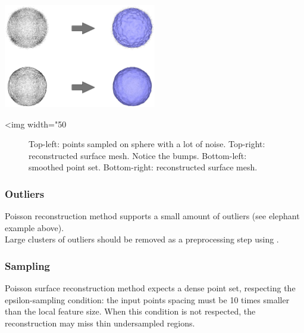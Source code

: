 \begin{center}
    \label{Surface_reconstruction_points_3-fig-noise}
    \begin{ccTexOnly}
      \includegraphics[width=0.5\textwidth]{Surface_reconstruction_points_3/noise} %
    \end{ccTexOnly}
    \begin{ccHtmlOnly}
        <img width="50%
    \end{ccHtmlOnly}
    \begin{figure}[h]
        \caption{Top-left: points sampled on sphere with a lot of noise.
                 Top-right: reconstructed surface mesh. Notice the bumps.
                 Bottom-left: smoothed point set.
                 Bottom-right: reconstructed surface mesh.}
    \end{figure}
\end{center}


\subsubsection{Outliers}

Poisson reconstruction method supports a small amount of outliers (see elephant example above).\\
Large clusters of outliers should be removed as a preprocessing step using .


\subsubsection{Sampling}

Poisson surface reconstruction method expects a dense point set, respecting the epsilon-sampling condition:
the input points spacing must be 10 times smaller than the local feature size. When this condition is not respected, the reconstruction may miss thin undersampled regions.


